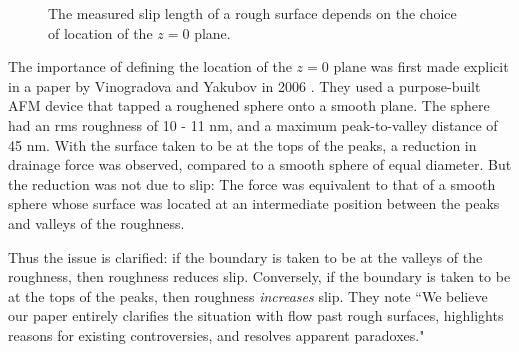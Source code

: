 \documentclass[12pt, a4paper, twoside, openright]{book}
\begin{document}
\clearpage
\begin{figure}[ht]
\centering
{}
\caption{The measured slip length of a rough surface depends on the choice of location of the $z=0$ plane.}\label{roughsliplengths}
\end{figure}


The importance of defining the location of the $z=0$ plane was first made explicit in a paper by Vinogradova and Yakubov in 2006 \cite{VinogradovaYakubov2006}.
They used a purpose-built AFM device that tapped a roughened sphere onto a smooth plane.  The sphere had an rms roughness of 10 - 11 nm, and a maximum peak-to-valley distance of 45 nm.  With the surface taken to be at the tops of the peaks, a reduction in drainage force was observed, compared to a smooth sphere of equal diameter.  But the reduction was not due to slip:  The force was equivalent to that of a smooth sphere whose surface was located at an intermediate position between the peaks and valleys of the roughness.

Thus the issue is clarified: if the boundary is taken to be at the valleys of the roughness, then roughness reduces slip.  Conversely, if the boundary is taken to be at the tops of the peaks, then roughness \emph{increases} slip.
They note ``We believe our paper entirely clarifies the situation with flow past rough surfaces, highlights reasons for existing controversies, and resolves apparent paradoxes."
\end{document}
